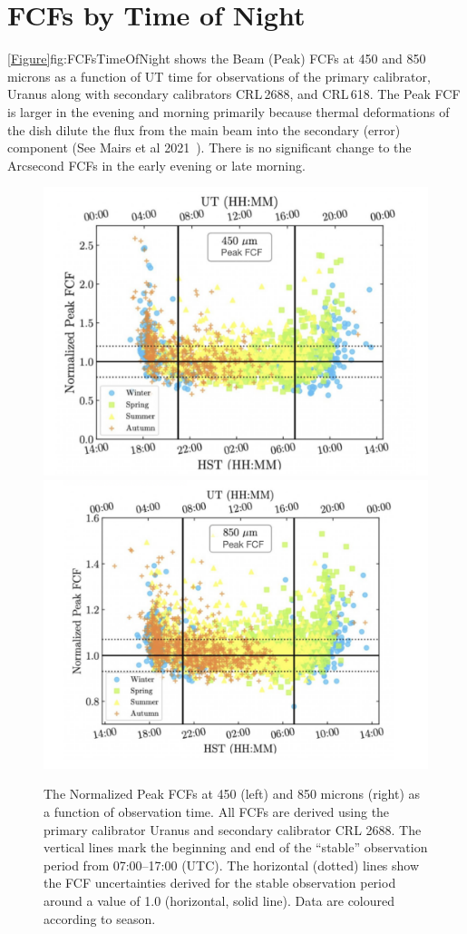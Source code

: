 \chapter{FCFs by Time of Night}
\label{app:fcfstime}

\cref{Figure}{fig:FCFsTimeOfNight}{} shows the Beam (Peak) FCFs at
450 and 850 microns as a function of UT time for observations of the
primary calibrator, Uranus along with secondary calibrators CRL\,2688, and CRL\,618.
The Peak FCF is larger in the evening and morning primarily because thermal 
deformations of the dish dilute the flux from the main beam into the secondary 
(error) component (See Mairs et al 2021~\cite{mairs21}). There is no significant 
change to the Arcsecond FCFs in the early evening or late morning.

\begin{figure}
\begin{center}
\includegraphics[width=0.47\linewidth]{sc21-FCFsTimeOfNight-450} \hspace{0.02\linewidth}
\includegraphics[width=0.47\linewidth]{sc21-FCFsTimeOfNight-850}
\caption[FCFs Time of Night]{The Normalized Peak FCFs at 450 (left) and 850 microns (right) 
as a function of observation time. All FCFs are derived using the primary calibrator Uranus and 
secondary calibrator CRL 2688. The vertical lines mark the beginning and end of the “stable” observation 
period from 07:00–17:00 (UTC). The horizontal (dotted) lines show the FCF uncertainties derived for the 
stable observation period around a value of 1.0 (horizontal, solid line). 
Data are coloured according to season. \label{fig:FCFsTimeOfNight}}
\end{center}
\end{figure}

